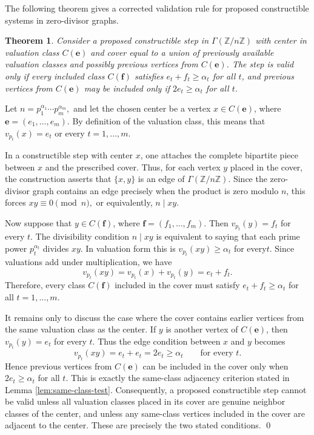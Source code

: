 \documentclass[12pt]{article}
\newtheorem{theorem}{Theorem}[section]
\theoremstyle{definition}
\renewenvironment{proof}{{\bf \noindent Proof.}}{\qed}
\begin{document}
\noindent The following theorem gives a corrected validation rule for proposed constructible systems in zero-divisor graphs.
\begin{theorem}\label{thm:validity-criterion}
Consider a proposed constructible step in $\Gamma(\mathbb{Z}/n\mathbb{Z})$ with center in valuation class $C(\mathbf e)$ and cover equal to a union of previously available valuation classes and possibly previous vertices from $C(\mathbf e)$.  The step is valid only if every included class $C(\mathbf f)$ satisfies $e_t+f_t\geq \alpha_t$ for all $t$, and previous vertices from $C(\mathbf e)$ may be included only if $2e_t\geq \alpha_t$ for all $t$.
\end{theorem}
\begin{proof}
	Let $
	n=p_1^{\alpha_1}\cdots p_m^{\alpha_m}, $
	and let the chosen center be a vertex $x\in C(\mathbf e)$, where
	$\mathbf e=(e_1,\ldots,e_m)$.  By definition of the valuation class, this means
	that $
	v_{p_t}(x)=e_t $ or every $t=1,\ldots,m. $
	
	 In a constructible step with center $x$, one attaches the complete bipartite
	piece between $x$ and the prescribed cover.  Thus, for each vertex $y$ placed
	in the cover, the construction asserts that $\{x,y\}$ is an edge of
	$\Gamma(\mathbb{Z}/n\mathbb{Z})$.  Since the zero-divisor graph contains an edge precisely
	when the product is zero modulo $n$, this forces
	$ xy\equiv 0 \pmod n,$ or  equivalently,
	$
	n\mid xy.
	$
	 
	 Now suppose that $y\in C(\mathbf f)$, where
	$\mathbf f=(f_1,\ldots,f_m)$.  Then
	$ v_{p_t}(y)=f_t $ for every $t.$ 	The divisibility condition $n\mid xy$ is equivalent to saying that each prime
	power $p_t^{\alpha_t}$ divides $xy$.  In valuation form this is
	$ v_{p_t}(xy)\geq \alpha_t$  for every$t.$
	Since valuations add under multiplication, we have
	$$
	v_{p_t}(xy)=v_{p_t}(x)+v_{p_t}(y)=e_t+f_t.
	$$
	Therefore, every class $C(\mathbf f)$ included in the cover must satisfy
	$ e_t+f_t\geq \alpha_t $  for all $t=1,\ldots,m. $
	
	 It remains only to discuss the case where the cover contains earlier vertices
	from the same valuation class as the center.  If $y$ is another vertex of
	$C(\mathbf e)$, then
	$ v_{p_t}(y)=e_t $ for every $t. $
	Thus the edge condition between $x$ and $y$ becomes
	$$
	v_{p_t}(xy)=e_t+e_t=2e_t\geq \alpha_t
	\qquad\text{for every }t.
	$$
	Hence previous vertices from $C(\mathbf e)$ can be included in the cover only
	when
	$ 2e_t\geq \alpha_t$  for all $t. $ This is exactly the same-class adjacency criterion stated in Lemma
	\ref{lem:same-class-test}. Consequently, a proposed constructible step cannot be valid unless all
	valuation classes placed in its cover are genuine neighbor classes of the
	center, and unless any same-class vertices included in the cover are adjacent
	to the center.  These are precisely the two stated conditions.
\end{proof}
\end{document}
